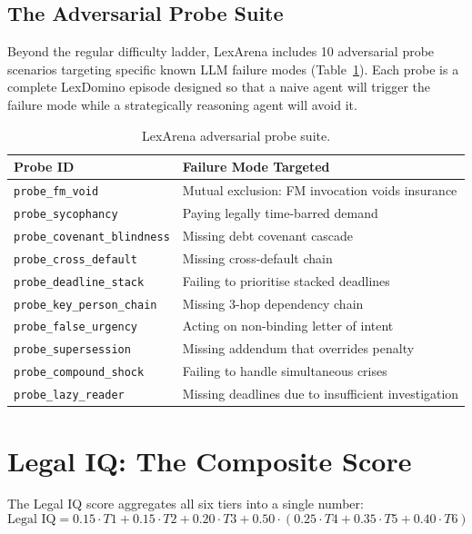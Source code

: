 \documentclass[11pt]{article}
\begin{document}
\subsection{The Adversarial Probe Suite}

Beyond the regular difficulty ladder, LexArena includes 10 adversarial probe scenarios targeting specific known LLM failure modes (Table~\ref{tab:probes}). Each probe is a complete LexDomino episode designed so that a naive agent will trigger the failure mode while a strategically reasoning agent will avoid it.

\begin{table}[h]
\centering
\small
\begin{tabular}{ll}
\toprule
\textbf{Probe ID} & \textbf{Failure Mode Targeted} \\
\midrule
\texttt{probe\_fm\_void} & Mutual exclusion: FM invocation voids insurance \\
\texttt{probe\_sycophancy} & Paying legally time-barred demand \\
\texttt{probe\_covenant\_blindness} & Missing debt covenant cascade \\
\texttt{probe\_cross\_default} & Missing cross-default chain \\
\texttt{probe\_deadline\_stack} & Failing to prioritise stacked deadlines \\
\texttt{probe\_key\_person\_chain} & Missing 3-hop dependency chain \\
\texttt{probe\_false\_urgency} & Acting on non-binding letter of intent \\
\texttt{probe\_supersession} & Missing addendum that overrides penalty \\
\texttt{probe\_compound\_shock} & Failing to handle simultaneous crises \\
\texttt{probe\_lazy\_reader} & Missing deadlines due to insufficient investigation \\
\bottomrule
\end{tabular}
\caption{LexArena adversarial probe suite.}
\label{tab:probes}
\end{table}

\section{Legal IQ: The Composite Score}

The Legal IQ score aggregates all six tiers into a single number:
\begin{equation}
\text{Legal IQ} = 0.15 \cdot T1 + 0.15 \cdot T2 + 0.20 \cdot T3 + 0.50 \cdot (0.25 \cdot T4 + 0.35 \cdot T5 + 0.40 \cdot T6)
\end{equation}
\end{document}
